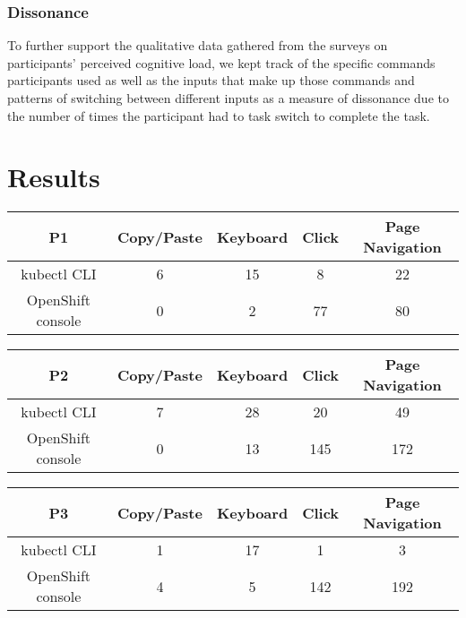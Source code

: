 \documentclass[11pt, oneside]{article}   	%
\begin{document}
\subsubsection{Dissonance}
To further support the qualitative data gathered from the surveys on participants' perceived cognitive load, we kept track of the specific commands participants used as well as the inputs that make up those commands and patterns of switching between different inputs as a measure of dissonance due to the number of times the participant had to task switch to complete the task. 

\section{Results}


\begin{center}
\begin{tabular}{ | c | c | c | c | c | } 
  \hline
  P1 & Copy/Paste & Keyboard & Click & Page Navigation \\ 
  \hline
  kubectl CLI & 6 & 15 & 8 & 22 \\ 
  \hline
  OpenShift console & 0 & 2 & 77 & 80 \\ 
  \hline
\end{tabular}
\end{center}

\begin{center}
\begin{tabular}{ | c | c | c | c | c | } 
  \hline
  P2 & Copy/Paste & Keyboard & Click & Page Navigation \\ 
  \hline
  kubectl CLI & 7 & 28 & 20 & 49 \\ 
  \hline
  OpenShift console & 0 & 13 & 145 & 172 \\ 
  \hline
\end{tabular}
\end{center}

\begin{center}
\begin{tabular}{ | c | c | c | c | c | } 
  \hline
  P3 & Copy/Paste & Keyboard & Click & Page Navigation \\ 
  \hline
  kubectl CLI & 1 & 17 & 1 & 3 \\ 
  \hline
  OpenShift console & 4 & 5 & 142 & 192 \\ 
  \hline
\end{tabular}
\end{center}
\end{document}
